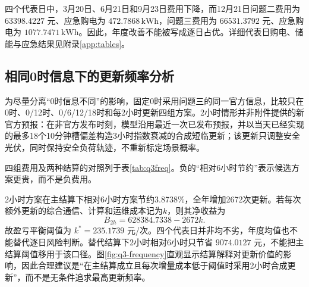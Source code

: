 四个代表日中，3月20日、6月21日和9月23日费用下降，而12月21日问题二费用为 $63398.4227$ 元、应急购电为 $472.7868\,\mathrm{kWh}$，问题三费用为 $66531.3792$ 元、应急购电为 $1077.7471\,\mathrm{kWh}$。因此，年度改善不能被写成逐日占优。详细代表日购电、储能与应急结果见附录\ref{app:tables}。

\subsection{相同0时信息下的更新频率分析}

为尽量分离“0时信息不同”的影响，固定0时采用问题三的同一官方信息，比较只在0时、0/12时、0/6/12/18时和每2小时更新四组方案。2小时情形并非附件提供的新官方预报：在非官方发布时刻，模型沿用最近一次已发布预报，并以当天已经实现的最多18个10分钟槽偏差构造3小时指数衰减的合成短临更新；该更新只调整安全光伏，同时保持安全负荷轨迹，不重新标定场景概率。

\noindent 四组费用及两种结算的对照列于表\ref{tab:q3freq}。负的“相对6小时节约”表示候选方案更贵，而不是负费用。

\begin{table}[H]
\centering
\caption{固定电价下相同0时信息的更新集合比较}
\label{tab:q3freq}
\end{table}

2小时方案在主结算下相对6小时方案节约3.8738\%，全年增加2672次更新。若每次额外更新的综合通信、计算和运维成本记为$k$，则其净收益为
\begin{equation}
 B_{2h}=628384.7338-2672k.
 \label{eq:breakeven-fixed}
\end{equation}
故盈亏平衡阈值为 $k^*=235.1739$ 元/次。四个代表日并非均不劣，年度均值也不能替代逐日风险判断。替代结算下2小时相对6小时只节省 $9074.0127$ 元，不能把主结算阈值移用于该口径。图\ref{fig:q3-frequency}直观显示结算解释对更新价值的影响，因此合理建议是“在主结算成立且每次增量成本低于阈值时采用2小时合成更新”，而不是无条件追求最高更新频率。

